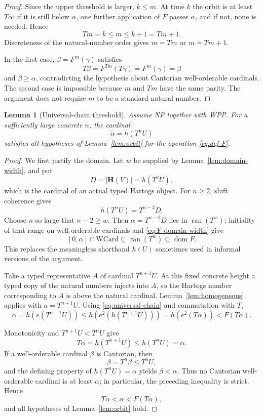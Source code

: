 \documentclass[11pt]{article}
\newtheorem{lemma}[theorem]{Lemma}
\numberwithin{equation}{section}
\theoremstyle{definition}
\theoremstyle{remark}
\begin{document}
\begin{proof}
Since the upper threshold is larger, $k\leq m$.  At time $k$ the orbit is
at least $T\alpha$; if it is still below $\alpha$, one further application
of $F$ passes $\alpha$, and if not, none is needed.  Hence
\[
 Tm=k\leq m\leq k+1=Tm+1.
\]
Discreteness of the natural-number order gives
$m=Tm$ or $m=Tm+1$.

In the first case, $\beta=F^m(\gamma)$ satisfies
\[
 T\beta=F^{Tm}(T\gamma)=F^m(\gamma)=\beta
\]
and $\beta\geq\alpha$, contradicting the hypothesis about Cantorian
well-orderable cardinals.  The second case is impossible because $m$ and
$Tm$ have the same parity.  The argument does not require $m$ to be a
standard natural number.
\end{proof}

\begin{lemma}[Universal-chain threshold]\label{lem:threshold}
Assume NF together with WPP.  For a sufficiently large concrete $n$,
the cardinal
\begin{equation}
 \alpha=h(T^nU)
 \label{eq:def-alpha}
\end{equation}
satisfies all hypotheses of Lemma~\ref{lem:orbit} for the operation
\eqref{eq:def-F}.
\end{lemma}

\begin{proof}
We first justify the domain.  Let $w$ be supplied by
Lemma~\ref{lem:domain-width}, and put
\[
 D=|\mathbf H(V)|=h(T^2U),
\]
which is the cardinal of an actual typed Hartogs object.  For $n\geq2$,
shift coherence gives
\begin{equation}
 h(T^nU)=T^{n-2}D.
 \label{eq:alpha-depth}
\end{equation}
Choose $n$ so large that $n-2\geq w$.  Then
$\alpha=T^{n-2}D$ lies in $\operatorname{ran}(T^w)$; initiality of that
range on well-orderable cardinals and \eqref{eq:F-domain-width} give
\[
 [0,\alpha]\cap\mathrm{WCard}
 \subseteq\operatorname{ran}(T^w)
 \subseteq\operatorname{dom}F.
\]
This replaces the meaningless shorthand $h(U)$ sometimes used in informal
versions of the argument.

Take a typed representative $A$ of cardinal $T^{n+1}U$.  At this
fixed concrete height a typed copy of the natural numbers injects into
$A$, so the Hartogs number corresponding to $A$ is above the natural
cardinal.  Lemma~\ref{lem:homogeneous} applies with $a=T^{n+1}U$.
Using \eqref{eq:universal-chain} and commutation with $T$,
\[
 \alpha
 =h(e(T^{n+1}U))
 \leq h(e^2(h(T^{n+1}U)))
 =h(e^2(T\alpha))
 <F(T\alpha).
\]

Monotonicity and $T^{n+1}U<T^nU$ give
\[
 T\alpha=h(T^{n+1}U)\leq h(T^nU)=\alpha.
\]
If a well-orderable cardinal $\beta$ is Cantorian, then
\[
 \beta=T^n\beta\leq T^nU,
\]
and the defining property of $h(T^nU)=\alpha$ yields
\(\beta<\alpha\).  Thus no Cantorian well-orderable cardinal is at least
$\alpha$; in particular, the preceding inequality is strict.  Hence
\[
 T\alpha<\alpha<F(T\alpha),
\]
and all hypotheses of Lemma~\ref{lem:orbit} hold.
\end{proof}
\end{document}
